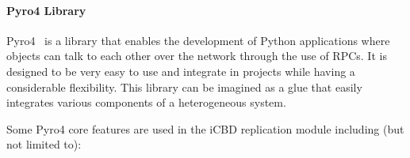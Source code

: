 \paragraph{Pyro4 Library}
\label{par:impl_pyro4_lib}


Pyro4~\cite{pyro4} is a library that enables the development of Python applications where objects can talk to each other over the network through the use of RPCs. It is designed to be very easy to use and integrate in projects while having a considerable flexibility. This library can be imagined as a glue that easily integrates various components of a heterogeneous system.

Some Pyro4 core features are used in the iCBD replication module including (but not limited to):

